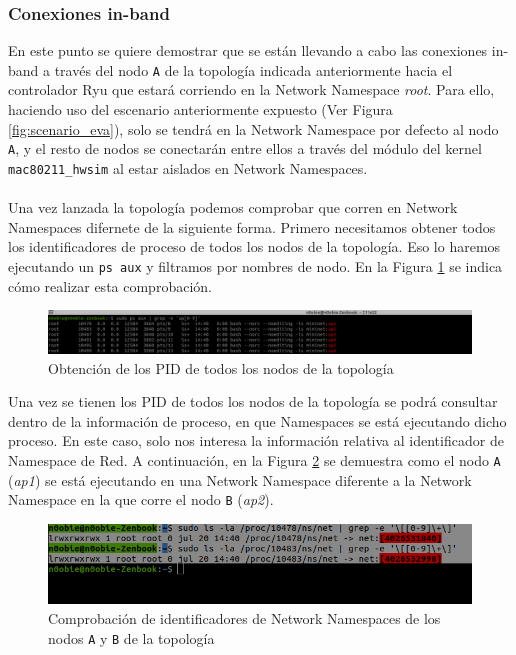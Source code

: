 \subsubsection{Conexiones in-band}

En este punto se quiere demostrar que se están llevando a cabo las conexiones in-band a través del nodo \texttt{A} de la topología indicada anteriormente hacia el controlador Ryu que estará corriendo en la Network Namespace \textit{root}. Para ello, haciendo uso del escenario anteriormente expuesto (Ver Figura \ref{fig:scenario_eva}), solo se tendrá en la Network Namespace por defecto al nodo \texttt{A}, y el resto de nodos se conectarán entre ellos a través del módulo del kernel \texttt{mac80211\_hwsim} al estar aislados en Network Namespaces. \\
\\
Una vez lanzada la topología podemos comprobar que corren en Network Namespaces difernete de la siguiente forma. Primero necesitamos obtener todos los identificadores de proceso de todos los nodos de la topología. Eso lo haremos ejecutando un \texttt{ps aux} y filtramos por nombres de nodo. En la Figura \ref{fig:inband3} se indica cómo realizar esta comprobación.\\


\begin{figure}[ht]
    \centering
    \includegraphics[width=\textwidth]{archivos/img/dev/inband3.png}
    \caption{Obtención de los PID de todos los nodos de la topología}
    \label{fig:inband3}
\end{figure}

Una vez se tienen los PID de todos los nodos de la topología se podrá consultar dentro de la información de proceso, en que Namespaces se está ejecutando dicho proceso. En este caso, solo nos interesa la información relativa al identificador de Namespace de Red. A continuación, en la Figura \ref{fig:inband4} se demuestra como el nodo \texttt{A} (\textit{ap1}) se está ejecutando en una Network Namespace diferente a la Network Namespace en la que corre el nodo \texttt{B} (\textit{ap2}).\\

\begin{figure}[ht]
    \centering
    \includegraphics[width=\textwidth]{archivos/img/dev/inband4.png}
    \caption{Comprobación de identificadores de Network Namespaces de los nodos \texttt{A} y \texttt{B} de la topología}
    \label{fig:inband4}
\end{figure}

